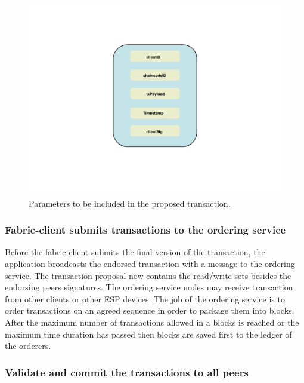 \begin{figure}[!htb]
    \centering
    \includegraphics[width=1\textwidth]{figures/endorsejson.png}
    \caption{Parameters to be included in the proposed transaction.}
    \label{fig:endorsejson}
\end{figure}


\subsubsection{Fabric-client submits transactions to the ordering service}

Before the fabric-client submits the final version of the transaction, the application broadcasts the endorsed transaction with a message to the ordering service.
The transaction proposal now contains the read/write sets besides the endorsing peers signatures. 
The ordering service nodes may receive transaction from other clients or other ESP devices. The job of the ordering service is to order transactions on an agreed sequence in order to package them into blocks. After the maximum number of transactions allowed in a blocks is reached or the maximum time duration has passed then blocks are saved first to the ledger of the orderers. 


\subsubsection{Validate and commit the transactions to all peers}

